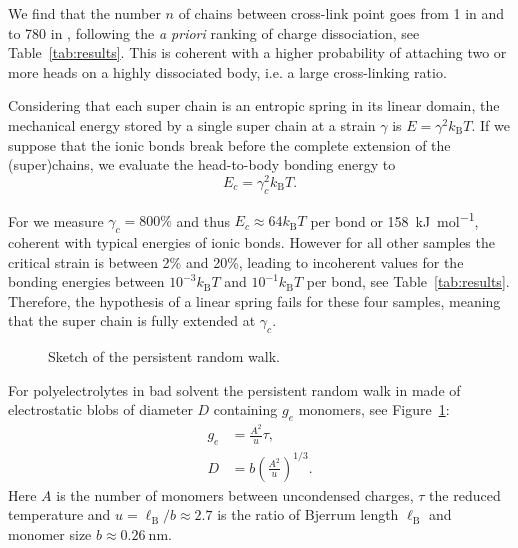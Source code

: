 \documentclass[12pt,a4paper]{article}
\begin{document}
We find that the number $n$ of chains between cross-link point goes from 1 in  and  to 780 in , following the \textit{a priori} ranking of charge dissociation, see Table~\ref{tab:results}. This is coherent with a higher probability of attaching two or more heads on a highly dissociated body, i.e. a large cross-linking ratio.

Considering that each super chain is an entropic spring in its linear domain, the mechanical energy stored by a single super chain at a strain $\gamma$ is $E = \gamma^2 k_\mathrm{B}T$. If we suppose that the ionic bonds break before the complete extension of the (super)chains, we evaluate the head-to-body bonding energy to
\begin{equation}
E_c = \gamma_c^2 k_\mathrm{B}T.
\end{equation}

For  we measure $\gamma_c = 800\%$ and thus $E_c \approx 64 k_\mathrm{B}T$ per bond or \SI{158}{\kilo\joule\per\mol}, coherent with typical energies of ionic bonds. However for all other samples the critical strain is between 2\% and 20\%, leading to incoherent values for the bonding energies between $10^{-3}k_\mathrm{B}T$ and $10^{-1}k_\mathrm{B}T$ per bond, see Table~\ref{tab:results}. Therefore, the hypothesis of a linear spring fails for these four samples, meaning that the super chain is fully extended at $\gamma_c$.

\begin{figure}
\begin{center}
\end{center}
\caption{Sketch of the persistent random walk.}
\label{fig:persistent}
\end{figure}

For polyelectrolytes in bad solvent the persistent random walk in made of electrostatic blobs of diameter $D$ containing $g_e$ monomers, see Figure~\ref{fig:persistent}:
\begin{align}
g_e &= \frac{A^2}{u}\tau\label{eq:ge},\\
D &= b \left(\frac{A^2}{u}\right)^{1/3}\label{eq:D}.
\end{align}
Here $A$ is the number of monomers between uncondensed charges, $\tau$ the reduced temperature and $u = \ell_\mathrm{B}/b \approx 2.7$ is the ratio of Bjerrum length $\ell_\mathrm{B}$ and monomer size $b\approx \SI{0.26}{\nano\metre}$. 
\end{document}
